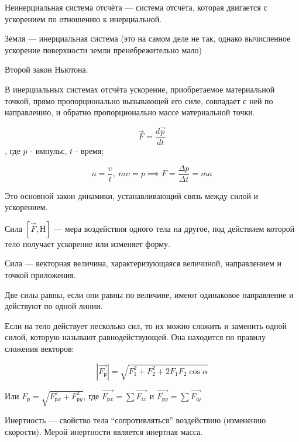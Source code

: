 \begin{definition}
    Неинерциальная система отсчёта — система отсчёта, которая двигается с ускорением по отношению к инерциальной.
\end{definition}

\begin{remark}
    Земля — инерциальная система (это на самом деле не так, однако вычисленное ускорение поверхности земли пренебрежительно мало)
\end{remark}

\begin{definition}
    Второй закон Ньютона.

    В инерциальных системах отсчёта ускорение, приобретаемое материальной точкой, прямо пропорционально вызывающей его силе, 
    совпадает с ней по направлению, и обратно пропорционально массе материальной точки.
\end{definition}

$$\vec F=\frac{d\vec p}{dt}$$, где $p$ - импульс, $t$ - время;

$$a=\frac{\upsilon}{t},\  m\upsilon=p \implies F=\frac{\Delta p}{\Delta t}=ma$$

\begin{remark}
    Это основной закон динамики, устанавливающий связь между силой и ускорением.
\end{remark}

\begin{definition}
    Сила $[\vec F, Н]$ — мера воздействия одного тела на другое, под действием которой тело получает ускорение или изменяет форму.
\end{definition}

Сила — векторная величина, характеризующаяся величиной, направлением и точкой приложения.

Две силы равны, если они равны по величине, имеют одинаковое направление и действуют по одной линии.

Если на тело действует несколько сил, то их можно сложить и заменить одной силой, которую называют равнодействующей. Она находится по правилу сложения векторов:

$$|\vec{F_р}| = \sqrt{F_1^2 + F_2^2 + 2F_1F_2\cos\alpha}$$

Или $F_р = \sqrt{F_{рx}^2 + F_{рy}^2}$, где $\vec{F_{рx}} = \sum \vec{F_{ix}}$ и $\vec{F_{рy}} = \sum \vec{F_{iy}}$

\begin{definition}
    Инертность — свойство тела “сопротивляться” воздействию (изменению скорости). Мерой инертности является инертная масса.
\end{definition}


